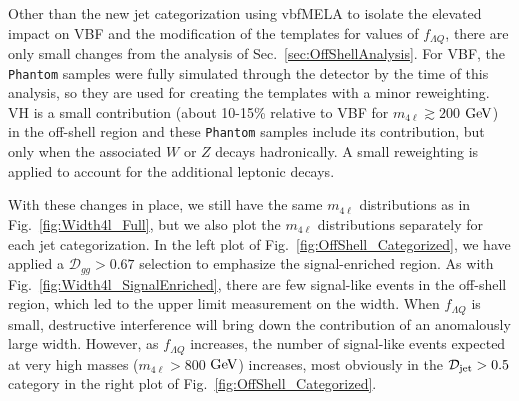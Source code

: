 Other than the new jet categorization using vbfMELA to isolate the elevated impact on VBF and the modification of the templates for values of $f_{\Lambda Q}$, there are only small changes from the analysis of Sec.~\ref{sec:OffShellAnalysis}. For VBF, the {\tt Phantom} samples were fully simulated through the detector by the time of this analysis, so they are used for creating the templates with a minor reweighting. VH is a small contribution (about 10-15\% relative to VBF for $m_{4\ell}\gtrsim200$ $\rm{GeV}$) in the off-shell region and these {\tt Phantom} samples include its contribution, but only when the associated $W$ or $Z$ decays hadronically. A small reweighting is applied to account for the additional leptonic decays.

With these changes in place, we still have the same $m_{4\ell}$ distributions as in Fig.~\ref{fig:Width4l_Full}, but we also plot the $m_{4\ell}$ distributions separately for each jet categorization. In the left plot of Fig.~\ref{fig:OffShell_Categorized}, we have applied a $\mathcal{D}_{gg} > 0.67$ selection to emphasize the signal-enriched region. As with Fig.~\ref{fig:Width4l_SignalEnriched}, there are few signal-like events in the off-shell region, which led to the upper limit measurement on the width. When $f_{\Lambda Q}$ is small, destructive interference will bring down the contribution of an anomalously large width. However, as $f_{\Lambda Q}$ increases, the number of signal-like events expected at very high masses ($m_{4\ell}>800$ $\rm{GeV}$) increases, most obviously in the $\mathcal{D}_{\rm jet}>0.5$ category in the right plot of Fig.~\ref{fig:OffShell_Categorized}.

